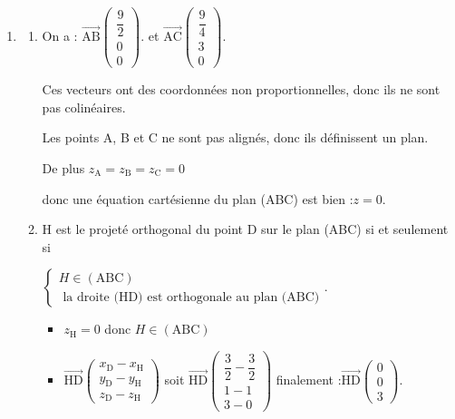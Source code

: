 \documentclass[10pt]{article}
\providecommand{\vectt}[1]{\overrightarrow{\mathrm{#1}}}
\providecommand{\np}[2][]{{#2~#1}}
\begin{document}
\begin{enumerate}
\begin{enumerate}
\begin{itemize}
			La distance CI est :\quad $\mathrm{CI} = \sqrt{\left(\dfrac{9}{4}-\dfrac{9}{4}\right)^2 + (3-0)^2 + (0 - 0)^2} =\sqrt{ 9} =3$;
			\end{itemize}
			On a donc : \quad $\mathcal{A}_{\mathrm{ABC}} = \dfrac{\mathrm{AB} \times \mathrm{CI}}{2} = \dfrac{1}{2}  \times \dfrac{9}{2} \times 3 = \dfrac{27}{4} = 6,75$.
			
			
			
			L'aire du triangle  ABC est bien égale à $\np[m^2]{6,75}$.
		\end{enumerate}

	\item \begin{enumerate}
		\item On a : $\vectt{AB} \begin{pmatrix} \dfrac{9}{2}\\0\\0\end{pmatrix} $.
		et  \quad $\vectt{AC} \begin{pmatrix}\dfrac{9}{4} \\ 3\\0 \end{pmatrix} $.
		
		Ces vecteurs ont des coordonnées non proportionnelles, donc ils ne sont pas colinéaires.
		
		Les points A, B et C ne sont pas alignés, donc ils définissent un plan.
		
		De plus $z_{\mathrm{A}}=z_{\mathrm{B}}=z_{\mathrm{C}}=0$ 
		
		
	donc une équation cartésienne du plan (ABC) est bien :\quad $z=0$.
		
		\item  H est le projeté orthogonal du point D sur le plan (ABC) si et seulement si 
		
		$\begin{cases}
			H \in (\mathrm{ABC})\\
			\text{ la droite (HD) est orthogonale au plan (ABC)} \end{cases}$. 
			
			\begin{itemize}
				\item $z_{\mathrm{H}}=0$  donc $H \in (\mathrm{ABC})$
				
				\item  	$\vectt{HD} \begin{pmatrix}
					x_{\mathrm{D}} - x_{\mathrm{H}}\\
					y_{\mathrm{D}} - y_{\mathrm{H}}\\
					z_{\mathrm{D}} - z_{\mathrm{H}} \end{pmatrix} $
				\quad soit \quad $\vectt{HD} \begin{pmatrix} \dfrac{3}{2}-\dfrac{3}{2}\\1-1\\3-0 \end{pmatrix} $
				\quad finalement :\quad $\vectt{HD} \begin{pmatrix} 0\\0\\3\end{pmatrix} $.
				

\end{itemize}
\end{enumerate}
\end{enumerate}
\end{document}
